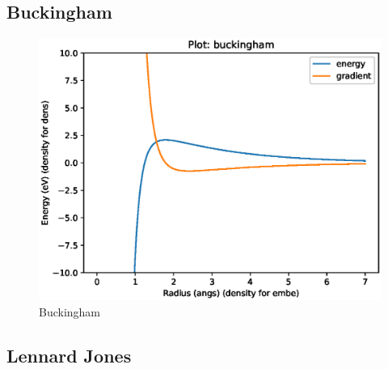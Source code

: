 
\FloatBarrier
\subsection{Buckingham}





\FloatBarrier
\begin{figure}[h]
  \begin{center}
    \includegraphics[width=0.7\linewidth]{appendix/functions/pots_plots/buckingham.eps}
    \caption{Buckingham}
    \label{figure:functionsbuckingham}
  \end{center}
\end{figure}





\FloatBarrier
\subsection{Lennard Jones}





